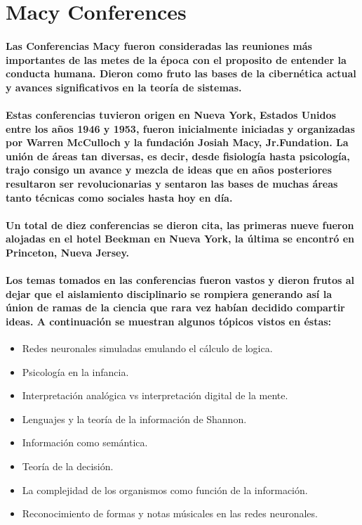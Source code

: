 \section{Macy Conferences}
  \paragraph{
  Las Conferencias Macy fueron consideradas las reuniones más importantes de las metes de la época con el proposito de entender la conducta humana. Dieron como fruto las bases de la cibernética actual y avances significativos en la teoría de sistemas.
  }
  \paragraph{
  Estas conferencias tuvieron origen en Nueva York, Estados Unidos entre los años 1946 y 1953, fueron inicialmente iniciadas y organizadas por Warren McCulloch y la fundación Josiah Macy, Jr.Fundation. La unión de áreas tan diversas, es decir, desde fisiología hasta psicología, trajo consigo un avance y mezcla de ideas que en años posteriores resultaron ser revolucionarias y sentaron las bases de muchas áreas tanto técnicas como sociales hasta hoy en día.
  }
  \paragraph{
  Un total de diez conferencias se dieron cita, las primeras nueve fueron alojadas en el hotel Beekman en Nueva York, la última se encontró en Princeton, Nueva Jersey.
  }
  \paragraph{
  Los temas tomados en las conferencias fueron vastos y dieron frutos al dejar que el aislamiento disciplinario se rompiera generando así la únion de ramas de la ciencia que rara vez habían decidido compartir ideas. A continuación se muestran algunos tópicos vistos en éstas:
  }
  \begin{itemize}
    \item Redes neuronales simuladas emulando el cálculo de logica.
    \item Psicología en la infancia.
    \item Interpretación analógica vs interpretación digital de la mente.
    \item Lenguajes y la teoría de la información de Shannon.
    \item Información como semántica.
    \item Teoría de la decisión.
    \item La complejidad de los organismos como función de la información.
    \item Reconocimiento de formas y notas músicales en las redes neuronales.
  \end{itemize}
